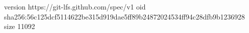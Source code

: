 version https://git-lfs.github.com/spec/v1
oid sha256:56c125dcf5114622be315d919dae5ff89b24872024534ff94c28dfb9b1236928
size 11092
